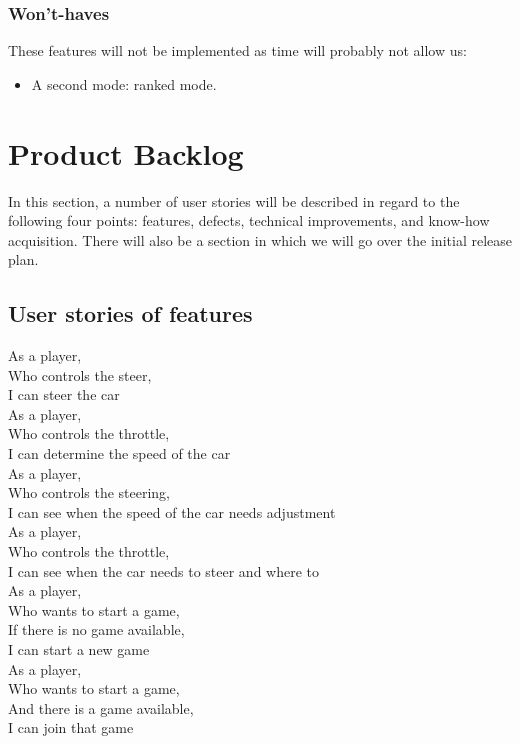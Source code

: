 \documentclass[11pt,twoside,a4paper]{article}
\begin{document}
\subsubsection{Won't-haves}
These features will not be implemented as time will probably not allow us:

\begin{itemize}
  \item A second mode: ranked mode.
\end{itemize}


\section{Product Backlog}
In this section, a number of user stories will be described in regard to the following four points: features, defects, technical improvements, and know-how acquisition. There will also be a section in which we will go over the initial release plan.


\subsection{User stories of features}
As a player,\\
Who controls the steer,\\
I can steer the car\\

As a player,\\
Who controls the throttle,\\
I can determine the speed of the car\\

As a player,\\
Who controls the steering,\\
I can see when the speed of the car needs adjustment\\

As a player,\\
Who controls the throttle,\\
I can see when the car needs to steer and where to\\

As a player,\\
Who wants to start a game,\\
If there is no game available,\\
I can start a new game\\

As a player,\\
Who wants to start a game,\\
And there is a game available,\\
I can join that game\\
\end{document}
